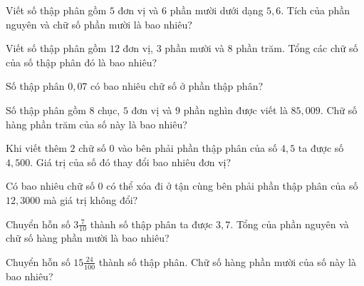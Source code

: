\begin{ex}
  Viết số thập phân gồm $5$ đơn vị và $6$ phần mười dưới dạng $5{,}6$. Tích của phần nguyên và chữ số phần mười là bao nhiêu?
\end{ex}

\begin{ex}
  Viết số thập phân gồm $12$ đơn vị, $3$ phần mười và $8$ phần trăm. Tổng các chữ số của số thập phân đó là bao nhiêu?
\end{ex}

\begin{ex}
  Số thập phân $0{,}07$ có bao nhiêu chữ số ở phần thập phân?
\end{ex}

\begin{ex}
  Số thập phân gồm $8$ chục, $5$ đơn vị và $9$ phần nghìn được viết là $85{,}009$. Chữ số hàng phần trăm của số này là bao nhiêu?
\end{ex}

\begin{ex}
  Khi viết thêm $2$ chữ số $0$ vào bên phải phần thập phân của số $4{,}5$ ta được số $4{,}500$. Giá trị của số đó thay đổi bao nhiêu đơn vị?
\end{ex}

\begin{ex}
  Có bao nhiêu chữ số $0$ có thể xóa đi ở tận cùng bên phải phần thập phân của số $12{,}3000$ mà giá trị không đổi?
\end{ex}

\begin{ex}
  Chuyển hỗn số $3\frac{7}{10}$ thành số thập phân ta được $3{,}7$. Tổng của phần nguyên và chữ số hàng phần mười là bao nhiêu?
\end{ex}

\begin{ex}
  Chuyển hỗn số $15\frac{24}{100}$ thành số thập phân. Chữ số hàng phần mười của số này là bao nhiêu?
\end{ex}

